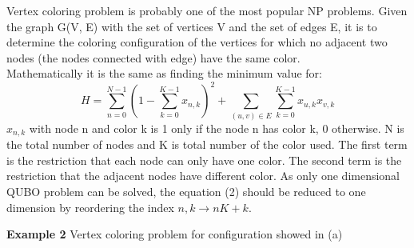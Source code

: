Vertex coloring problem is probably one of the most popular NP problems. Given the graph G(V, E) with the set of vertices V and the set of edges E, it is to determine the coloring configuration of the vertices for which no adjacent two nodes (the nodes connected with edge) have the same color. \\ 
Mathematically it is the same as finding the minimum value for:
\begin{equation}
H = \sum_{n=0}^{N-1}(1-\sum_{k=0}^{K-1}x_{n,k})^2 + \sum_{(u,v)\in E}\sum_{k=0}^{K-1}x_{u,k}x_{v,k}
\end{equation}
$x_{n,k}$ with node n and color k is 1 only if the node n has color k, 0 otherwise. N is the total number of nodes and K is total number of the color used. The first term is the restriction that each node can only have one color. The second term is the restriction that the adjacent nodes have different color.  As only one dimensional QUBO problem can be solved, the equation (2) should be reduced to one dimension by reordering the index $n,k \rightarrow nK+k$. 
\begin{tcolorbox}[standard jigsaw,
    opacityback=0,  %
    boxrule=0.5pt,label={example1}]
    {\bf Example 2}
    \tcbline 
  Vertex  coloring problem for configuration showed in (a)
    \end{tcolorbox}
   
